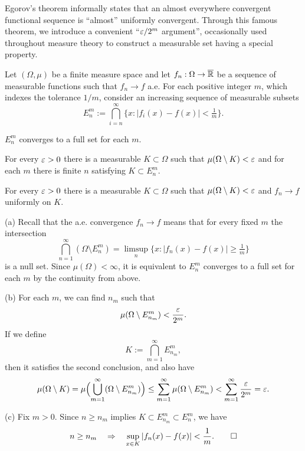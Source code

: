 \documentclass{../../large}
\begin{document}
\begin{prb}
Egorov's theorem informally states that an almost everywhere convergent functional sequence is ``almost'' uniformly convergent.
Through this famous theorem, we introduce a convenient ``$\varepsilon/2^m$ argument'', occasionally used throughout measure theory to construct a measurable set having a special property.

Let $(\Omega,\mu)$ be a finite measure space and let $f_n:\Omega\to\overline{\mathbb{R}}$ be a sequence of measurable functions such that $f_n\to f$ a.e.
For each positive integer $m$, which indexes the tolerance $1/m$, consider an increasing sequence of measurable subsets
\[E_n^m:=\bigcap_{i=n}^\infty\{x:|f_i(x)-f(x)|<\tfrac1m\}.\]
\begin{parts}
\item $E_n^m$ converges to a full set for each $m$.
\item For every $\varepsilon>0$ there is a measurable $K\subset\Omega$ such that $\mu(\Omega\setminus K)<\varepsilon$ and for each $m$ there is finite $n$ satisfying $K\subset E_n^m$.
\item For every $\varepsilon>0$ there is a measurable $K\subset\Omega$ such that $\mu(\Omega\setminus K)<\varepsilon$ and $f_n\to f$ uniformly on $K$.
\end{parts}
\end{prb}
\begin{pf}
(a)
Recall that the a.e. convergence $f_n\to f$ means that for every fixed $m$ the intersection
\[\bigcap_{n=1}^\infty(\Omega\setminus E_n^m)=\limsup_n\{x:|f_n(x)-f(x)|\ge\tfrac1m\}\]
is a null set.
Since $\mu(\Omega)<\infty$, it is equivalent to $E_n^m$ converges to a full set for each $m$ by the continuity from above.

(b)
For each $m$, we can find $n_m$ such that
\[\mu(\Omega\setminus E_{n_m}^m)<\frac{\varepsilon}{2^m}.\]
If we define
\[K:=\bigcap_{m=1}^\infty E_{n_m}^m,\]
then it satisfies the second conclusion, and also have
\[\mu(\Omega\setminus K)=\mu\Bigl(\bigcup_{m=1}^\infty(\Omega\setminus E_{n_m}^m)\Bigr)\le\sum_{m=1}^\infty\mu(\Omega\setminus E_{n_m}^m)<\sum_{m=1}^\infty\frac{\varepsilon}{2^m}=\varepsilon.\]


(c)
Fix $m>0$.
Since $n\ge n_m$ implies $K\subset E_{n_m}^m\subset E_n^m$, we have
\[n\ge n_m\quad\Rightarrow\quad\sup_{x\in K}|f_n(x)-f(x)|<\frac1m.\qedhere\]
\end{pf}
\end{document}
